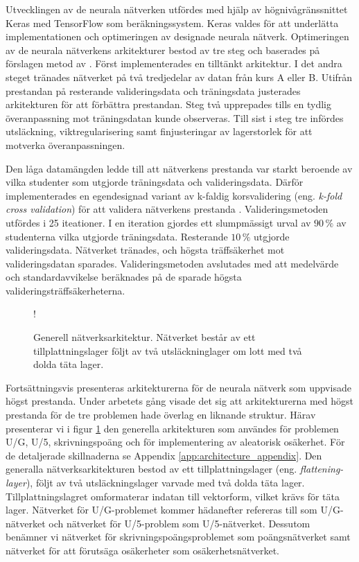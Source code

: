 Utvecklingen av de neurala nätverken utfördes med hjälp av högnivågränssnittet Keras \cite{Chollet} med TensorFlow \cite{Chollet} som beräkningssystem. Keras valdes för att underlätta implementationen och optimeringen av designade neurala nätverk. Optimeringen av de neurala nätverkens arkitekturer bestod av tre steg och baserades på förslagen metod av \cite{Chollet}. Först implementerades en tilltänkt arkitektur. I det andra steget tränades nätverket på två tredjedelar av datan från kurs A eller B. Utifrån prestandan på resterande valideringsdata och träningsdata justerades arkitekturen för att förbättra prestandan. Steg två upprepades tills en tydlig överanpassning mot träningsdatan kunde observeras. Till sist i steg tre infördes utsläckning, viktregularisering samt finjusteringar av lagerstorlek för att motverka överanpassningen. 

Den låga datamängden ledde till att nätverkens prestanda var starkt beroende av vilka studenter som utgjorde träningsdata och valideringsdata. Därför implementerades en egendesignad variant av k-faldig korsvalidering (eng. \emph{k-fold cross validation}) för att validera nätverkens prestanda  \cite{Chollet}. Valideringsmetoden utfördes i 25 iteationer. I en iteration gjordes ett slumpmässigt urval av $90 \, \%$ av studenterna vilka utgjorde träningsdata. Resterande $10 \, \%$ utgjorde valideringsdata. Nätverket tränades, och högsta träffsäkerhet mot valideringsdatan sparades. Valideringsmetoden avslutades med att medelvärde och standardavvikelse beräknades på de sparade högsta valideringsträffsäkerheterna.  

\begin{figure}[hbtp]
    \centering
    \resizebox {0.9\textwidth} {!} {
        
    }
    \caption{Generell nätverksarkitektur. Nätverket består av ett tillplattningslager följt av två utsläckninglager om lott med två dolda täta lager.}
    \label{fig:gu-u5_model}
\end{figure}

Fortsättningsvis presenteras arkitekturerna för de neurala nätverk som uppvisade högst prestanda. Under arbetets gång visade det sig att arkitekturerna med högst prestanda för de tre problemen hade överlag en liknande struktur. Härav presenterar vi i figur \ref{fig:gu-u5_model} den generella arkitekturen som användes för problemen U/G, U/5, skrivningspoäng och för implementering av aleatorisk osäkerhet. För de detaljerade skillnaderna se Appendix \ref{app:architecture_appendix}. Den generalla nätverksarkitekturen bestod av ett tillplattningslager (eng. \emph{flattening-layer}), följt av två utsläckningslager varvade med två dolda täta lager. Tillplattningslagret omformaterar indatan till vektorform, vilket krävs för täta lager. Nätverket för U/G-problemet kommer hädanefter refereras till som U/G-nätverket och nätverket för U/5-problem som U/5-nätverket. Dessutom benämner vi nätverket för skrivningspoängsproblemet  som poängsnätverket samt nätverket för att förutsäga osäkerheter som osäkerhetsnätverket.

